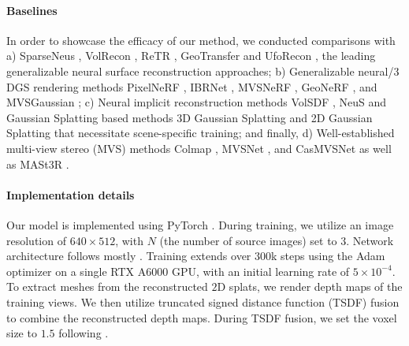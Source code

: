 
\vspace{-15pt}
\paragraph{Baselines}
In order to showcase the efficacy of our method, we conducted comparisons with a) SparseNeus \cite{long2022sparseneus}, VolRecon \cite{ren2023volrecon}, ReTR \cite{liang2024retr}, GeoTransfer \cite{jena2024geotransfer} and UfoRecon \cite{na2024uforecon}, the leading generalizable neural surface reconstruction approaches; b) Generalizable neural/$3$DGS rendering methods PixelNeRF \cite{yu2021pixelnerf}, IBRNet \cite{wang2021ibrnet}, MVSNeRF \cite{chen2021mvsnerf}, GeoNeRF \cite{johari2022geonerf}, and MVSGaussian \cite{liu2024fast}; c) Neural implicit reconstruction methods VolSDF \cite{yariv2021volume}, NeuS \cite{wang2021neus} and Gaussian Splatting based methods 3D Gaussian Splatting \cite{kerbl20233d} and 2D Gaussian Splatting \cite{huang20242d} that necessitate scene-specific training; and finally, d) Well-established multi-view stereo (MVS) methods Colmap \cite{schonberger2016structure}, MVSNet \cite{yao2018mvsnet}, and CasMVSNet \cite{gu2020cascade} as well as MASt3R \cite{leroy2024grounding}. 
\vspace{-15pt}
\paragraph{Implementation details}
Our model is implemented using PyTorch \cite{paszke2019pytorch}. During training, we utilize an image resolution of $640 \times 512$, with $N$ (the number of source images) set to $3$. Network architecture follows mostly \cite{liu2024fast}. Training extends over $300$k steps using the Adam optimizer \cite{kingma2014adam} on a single RTX A$6000$ GPU, with an initial learning rate of $5 \times 10^{-4}$. To extract meshes from the reconstructed $2$D splats, we render depth maps of the training views. We then utilize truncated signed distance function (TSDF) fusion to combine the reconstructed depth maps. During TSDF fusion, we set the voxel size to $1.5$ following \cite{long2022sparseneus, ren2023volrecon, liang2024retr, jena2024geotransfer, na2024uforecon}.

